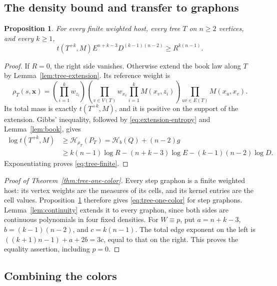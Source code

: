 \documentclass[11pt,a4paper]{article}
\newtheorem{proposition}[theorem]{Proposition}
\theoremstyle{remark}
\numberwithin{equation}{section}
\begin{document}
\subsection{The density bound and transfer to graphons}

\begin{proposition}\label{prop:tree-finite}
For every finite weighted host, every tree $T$ on $n\geq2$
vertices, and every $k\geq1$,
\begin{equation}\label{eq:tree-finite}
 t(T^{+k},M)E^{n+k-3}D^{(k-1)(n-2)}\geq R^{k(n-1)}.
\end{equation}
\end{proposition}
\begin{proof}
If $R=0$, the right side vanishes. Otherwise extend the book law
along $T$ by Lemma~\ref{lem:tree-extension}. Its reference weight
is
\[
 \rho_T(s,\mathbf x)
 =\left(\prod_{i=1}^kw_{z_i}\right)
  \left(\prod_{v\in V(T)}w_{x_v}\prod_{i=1}^kM(x_v,z_i)\right)
  \prod_{uv\in E(T)}M(x_u,x_v).
\]
Its total mass is exactly $t(T^{+k},M)$, and it is positive on
the support of the extension. Gibbs' inequality, followed by
\eqref{eq:extension-entropy} and Lemma~\ref{lem:book}, gives
\begin{align*}
 \log t(T^{+k},M)
 &\geq\mathcal H_{\rho_T}(P_T)
       =\mathcal H_b(Q)+(n-2)g\\
 &\geq k(n-1)\log R-(n+k-3)\log E
                       -(k-1)(n-2)\log D.
\end{align*}
Exponentiating proves \eqref{eq:tree-finite}.
\end{proof}

\begin{proof}[Proof of Theorem~\ref{thm:tree-one-color}]
Every step graphon is a finite weighted host: its vertex weights
are the measures of its cells, and its kernel entries are the
cell values. Proposition~\ref{prop:tree-finite} therefore gives
\eqref{eq:tree-one-color} for step graphons.
Lemma~\ref{lem:continuity} extends it to every graphon, since
both sides are continuous polynomials in four fixed densities.
For $W\equiv p$, put $a=n+k-3$, $b=(k-1)(n-2)$, and
$c=k(n-1)$. The total edge exponent on the left is
$((k+1)n-1)+a+2b=3c$, equal to that on the right.
This proves the equality assertion, including $p=0$.
\end{proof}

\subsection{Combining the colors}
\end{document}
